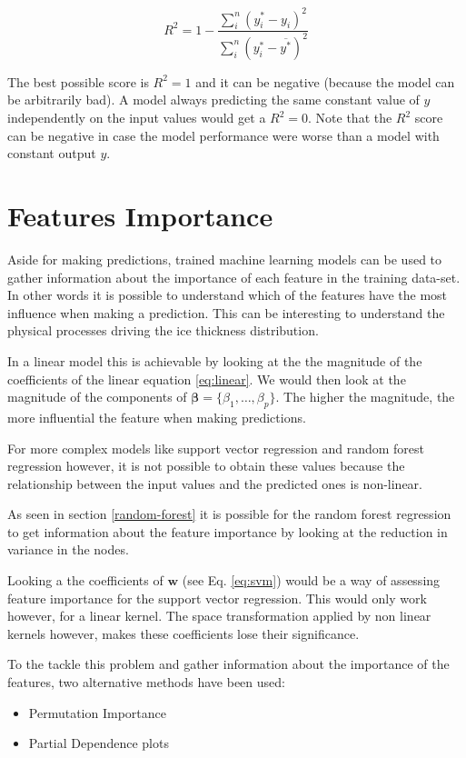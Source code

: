 \begin{equation}\label{eq:score}
R^2 = 1 - \frac{\sum_{i}^{n}(y^*_i-y_i)^2}{\sum_{i}^{n}(y^*_i-\overline{y^*})^2}
\end{equation}

The best possible score is $R^2 = 1$ and it can be negative (because the model can be arbitrarily bad). A model always predicting the same constant value of $y$ independently on the input values would get a $R^2 = 0$. Note that the $R^2$ score can be negative in case the model performance were worse than a model with constant output $y$.

\section{Features Importance}\label{featuresimp}
Aside for making predictions, trained machine learning models can be used to gather information about the importance of each feature in the training data-set. In other words it is possible to understand which of the features have the most influence when making a prediction. This can be interesting to understand the physical processes driving the ice thickness distribution.

In a linear model this is achievable by looking at the the magnitude of the coefficients of the linear equation \ref{eq:linear}. We would then look at the magnitude of the components of $ \bm{\beta} = \{\beta_{1},\ldots ,\beta_{p}\}$. The higher the magnitude, the more influential the feature when making predictions.

For more complex models like support vector regression and random forest regression however, it is not possible to obtain these values because the relationship between the input values and the predicted ones is non-linear.

As seen in section \ref{random-forest} it is possible for the random forest regression to get information about the feature importance by looking at the reduction in variance in the nodes.

Looking a the coefficients of $\mathbf{w}$ (see Eq. \ref{eq:svm}) would be a way of assessing feature importance for the support vector regression. This would only work however, for a linear kernel. The space transformation applied by non linear kernels however, makes these coefficients lose their significance.

To the tackle this problem and gather information about the importance of the features, two alternative methods have been used:
\begin{itemize}
	\item Permutation Importance
	\item Partial Dependence plots
\end{itemize} 

